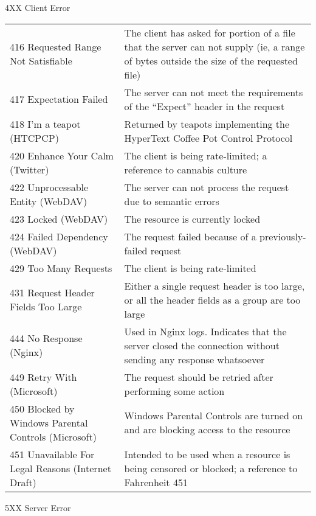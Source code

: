 \documentclass[final,table]{beamer}
\begin{document}
\begin{frame}{}
\begin{block}{\huge 4XX Client Error}
\begin{tabular}{p{} p{}}
        416 Requested Range Not Satisfiable & The client has asked for portion of a file that the server can not supply (ie, a range of bytes outside the size of the requested file) \\
        417 Expectation Failed & The server can not meet the requirements of the ``Expect'' header in the request \\
        418 I'm a teapot (HTCPCP) & Returned by teapots implementing the HyperText Coffee Pot Control Protocol \\
        420 Enhance Your Calm (Twitter) & The client is being rate-limited; a reference to cannabis culture \\
        422 Unprocessable Entity (WebDAV) & The server can not process the request due to semantic errors \\
        423 Locked (WebDAV) & The resource is currently locked \\
        424 Failed Dependency (WebDAV) & The request failed because of a previously-failed request \\
        429 Too Many Requests & The client is being rate-limited \\
        431 Request Header Fields Too Large & Either a single request header is too large, or all the header fields as a group are too large \\
        444 No Response (Nginx) & Used in Nginx logs. Indicates that the server closed the connection without sending any response whatsoever \\
        449 Retry With (Microsoft) & The request should be retried after performing some action \\
        450 Blocked by Windows Parental Controls (Microsoft) & Windows Parental Controls are turned on and are blocking access to the resource \\
        451 Unavailable For Legal Reasons (Internet Draft) & Intended to be used when a resource is being censored or blocked; a reference to Fahrenheit 451 \\
      \end{tabular}
    \end{block}
    \begin{block}{\huge 5XX Server Error}

      \vspace{0.3in}


\end{block}
\end{frame}
\end{document}
